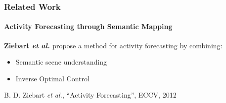 \begin{frame}
	\frametitle{Related Work}
	\framesubtitle{Activity Forecasting through Semantic Mapping}
	
	\vspace{0.33cm}
	
	\large
	
	\textbf{Ziebart \emph{et al.} \cite{Kitani12}} propose a method for activity forecasting by
	combining:
	
	\begin{itemize}
		\item Semantic scene understanding
		\vspace{0.05cm}
		\item Inverse Optimal Control
	\end{itemize}
	
	\vspace{-0.2cm}
	
	\begin{center}
	\end{center}
	
	\vspace{-0.3cm}
	
	\tiny
	
	\cite{Kitani12} B. D. Ziebart \emph{et al.}, ``Activity Forecasting'', ECCV, 2012
\end{frame}


